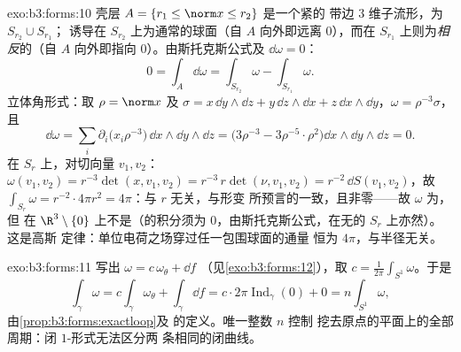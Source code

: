 \begin{solution}{exo:b3:forms:10}
壳层 $A = \{r_1 \leq \norm x \leq r_2\}$ 是一个紧的
带边 $3$ 维子流形，为 $S_{r_2}\cup S_{r_1}$；
诱导在
$S_{r_2}$ 上为通常的球面（自 $A$ 向外即远离 $0$），而在
$S_{r_1}$ 上则为\emph{相反}的（自 $A$ 向外即指向
$0$）。由斯托克斯公式及 $\dd\omega = 0$：
\[
0 = \int_A\dd\omega = \int_{S_{r_2}}\omega -
\int_{S_{r_1}}\omega .
\]
立体角形式：取 $\rho = \norm x$ 及 $\sigma =
x\,\dd y\wedge\dd z + y\,\dd z\wedge\dd x + z\,\dd
x\wedge\dd y$，$\omega = \rho^{-3}\sigma$，且
\[
\dd\omega = \sum_i\partial_i\bigl(x_i\rho^{-3}\bigr)\,
\dd x\wedge\dd y\wedge\dd z
= \bigl(3\rho^{-3} - 3\rho^{-5}\cdot\rho^2\bigr)\dd
x\wedge\dd y\wedge\dd z = 0 .
\]
在 $S_r$ 上，对切向量 $v_1, v_2$：$\omega(v_1, v_2) =
r^{-3}\det(x, v_1, v_2) = r^{-3}\,r\det(\nu, v_1, v_2) =
r^{-2}\,\dd S(v_1, v_2)$，故 $\int_{S_r}\omega =
r^{-2}\cdot4\pi r^2 = 4\pi$：与 $r$ 无关，与形变
所预言的一致，且非零——故 $\omega$ 为，但
在 $\R^3\setminus\{0\}$ 上不是（的积分须为
$0$，由斯托克斯公式，在无的 $S_r$ 上亦然）。这是高斯
定律：单位电荷之场穿过任一包围球面的通量
恒为 $4\pi$，与半径无关。
\end{solution}

\begin{solution}{exo:b3:forms:11}
写出 $\omega = c\,\omega_\theta + \dd f$
（见\cref{exo:b3:forms:12}），取 $c =
\frac1{2\pi}\int_{S^1}\omega$。于是
\[
\int_\gamma\omega = c\int_\gamma\omega_\theta +
\int_\gamma\dd f
= c\cdot2\pi\operatorname{Ind}_\gamma(0) + 0
= n\int_{S^1}\omega,
\]
由\cref{prop:b3:forms:exactloop}及
的定义。唯一整数 $n$ 控制
挖去原点的平面上的全部周期：闭 $1$-形式无法区分两
条相同的闭曲线。
\end{solution}

